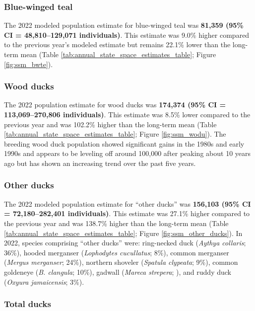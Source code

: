 \documentclass[
  12pt,
]{article}
\begin{document}
\hypertarget{blue-winged-teal}{%
\subsubsection{Blue-winged teal}\label{blue-winged-teal}}

The 2022 modeled population estimate for blue-winged teal was
\textbf{81,359 (95\% CI = 48,810--129,071 individuals)}. This estimate
was 9.0\% higher compared to the previous year's modeled estimate but
remains 22.1\% lower than the long-term mean (Table
\ref{tab:annual_state_space_estimates_table}; Figure
\ref{fig:ssm_bwte}).

\hypertarget{wood-ducks}{%
\subsubsection{Wood ducks}\label{wood-ducks}}

The 2022 population estimate for wood ducks was \textbf{174,374 (95\% CI
= 113,069--270,806 individuals)}. This estimate was 8.5\% lower compared
to the previous year and was 102.2\% higher than the long-term mean
(Table \ref{tab:annual_state_space_estimates_table}; Figure
\ref{fig:ssm_wodu}). The breeding wood duck population showed
significant gains in the 1980s and early 1990s and appears to be
leveling off around 100,000 after peaking about 10 years ago but has
shown an increasing trend over the past five years.

\hypertarget{other-ducks}{%
\subsubsection{Other ducks}\label{other-ducks}}

The 2022 modeled population estimate for ``other ducks'' was
\textbf{156,103 (95\% CI = 72,180--282,401 individuals)}. This estimate
was 27.1\% higher compared to the previous year and was 138.7\% higher
than the long-term mean (Table
\ref{tab:annual_state_space_estimates_table}; Figure
\ref{fig:ssm_other_ducks}). In 2022, species comprising ``other ducks''
were: ring-necked duck (\emph{Aythya collaris}; 36\%), hooded merganser
(\emph{Lophodytes cucullatus}; 8\%), common merganser (\emph{Mergus
merganser}; 24\%), northern shoveler (\emph{Spatula clypeata}; 9\%),
common goldeneye (\emph{B. clangula}; 10\%), gadwall (\emph{Mareca
strepera}; ), and ruddy duck (\emph{Oxyura jamaicensis}; 3\%).

\hypertarget{total-ducks}{%
\subsubsection{Total ducks}\label{total-ducks}}
\end{document}
